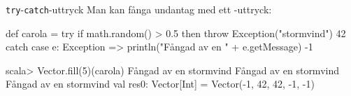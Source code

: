 

\begin{Slide}{\texttt{try}-\texttt{catch}-uttryck}\SlideFontSmall
Man kan fånga undantag med ett -uttryck:
\begin{Code}
def carola = 
  try 
    if math.random() > 0.5 then throw Exception("stormvind")
    42
  catch 
    case e: Exception =>
      println("Fångad av en " + e.getMessage)
      -1

\end{Code}
\pause
\begin{REPL}
scala> Vector.fill(5)(carola)
Fångad av en stormvind
Fångad av en stormvind
Fångad av en stormvind
val res0: Vector[Int] = Vector(-1, 42, 42, -1, -1)
\end{REPL}
\end{Slide}
